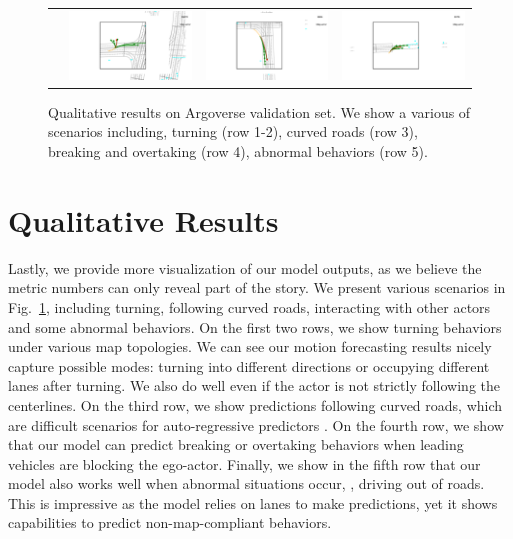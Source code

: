 \begin{figure}[t]
\begin{tabular}{cccc}
&\includegraphics[width=0.24\linewidth]{figures/supp/map2.pdf}
&\includegraphics[width=0.24\linewidth]{figures/supp/map3.pdf}
&\includegraphics[width=0.24\linewidth]{figures/supp/map4.pdf}\\

\end{tabular}
\caption{Qualitative results on Argoverse validation set. We show a various of
scenarios including, turning (row 1-2), curved roads (row 3), breaking and
overtaking (row 4), abnormal behaviors (row 5).}
\label{fig:supp_vis}
\end{figure}


\section{Qualitative Results}
\label{sec:supp_qual}
Lastly, we provide more visualization of our model outputs, as we believe the
metric numbers can only reveal part of the story. We present various
scenarios in Fig.~\ref{fig:supp_vis}, including turning, following curved roads,
interacting with other actors and some abnormal behaviors. On the first two
rows, we show turning behaviors under various map topologies. We can see
our motion forecasting results nicely capture possible modes: turning into
different directions or occupying different lanes after turning. We also do well 
even if the actor is not strictly following the centerlines. On the
third row, we show predictions following curved roads, which are difficult
scenarios for auto-regressive predictors \cite{nmp,intentnet}. On the fourth
row, we show that our model can predict breaking or overtaking behaviors when
leading vehicles are blocking the ego-actor. Finally, we show in the fifth row
that our model also works well when abnormal situations occur, \eg, driving out of
roads. This is impressive as the model relies on
lanes to make predictions, yet it shows capabilities to predict non-map-compliant
behaviors.
